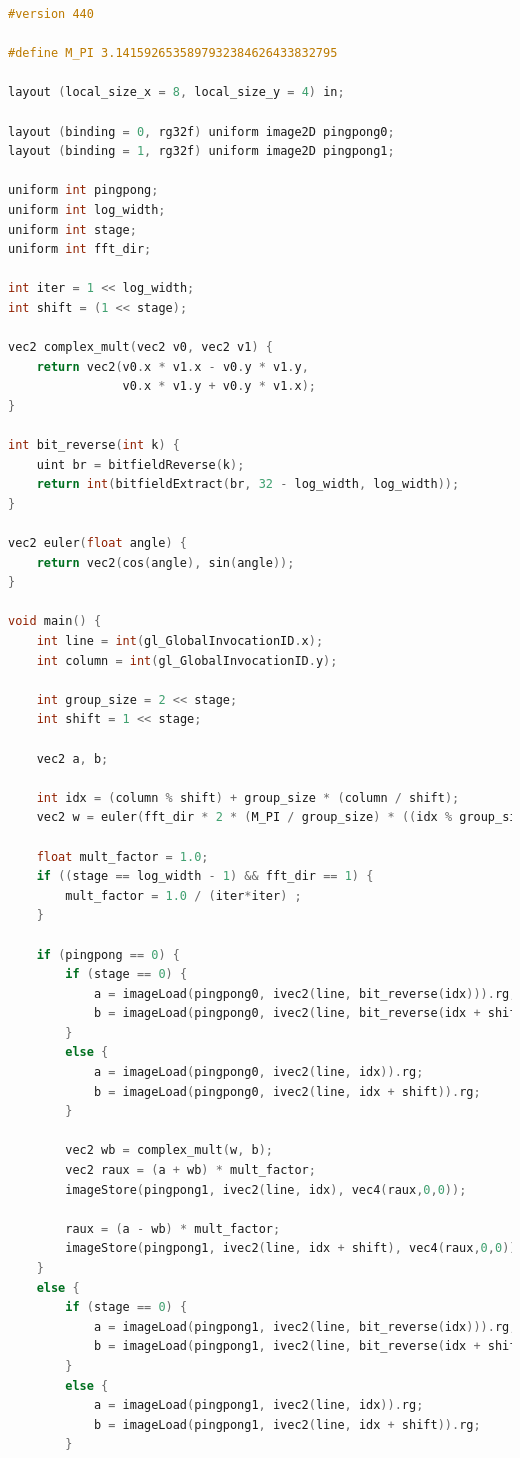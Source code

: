 \documentclass[
  oneside,
  11pt, a4paper,
  footinclude=true,
  headinclude=true,
  cleardoublepage=empty
]{scrbook}
\begin{document}

\begin{lstlisting}[language=C,caption={FFT Radix-2 Cooley-Tukey Vertical stage pass, see \autoref{sec:ct-impl}},label={lst:glsl-radix2-ct-stage-vertical}]
#version 440

#define M_PI 3.1415926535897932384626433832795

layout (local_size_x = 8, local_size_y = 4) in;

layout (binding = 0, rg32f) uniform image2D pingpong0;
layout (binding = 1, rg32f) uniform image2D pingpong1;

uniform int pingpong;
uniform int log_width;
uniform int stage;
uniform int fft_dir;

int iter = 1 << log_width;
int shift = (1 << stage);

vec2 complex_mult(vec2 v0, vec2 v1) {
	return vec2(v0.x * v1.x - v0.y * v1.y,
				v0.x * v1.y + v0.y * v1.x);
}

int bit_reverse(int k) {
    uint br = bitfieldReverse(k);
    return int(bitfieldExtract(br, 32 - log_width, log_width));
}

vec2 euler(float angle) {
	return vec2(cos(angle), sin(angle));
}

void main() {
	int line = int(gl_GlobalInvocationID.x);
	int column = int(gl_GlobalInvocationID.y);

	int group_size = 2 << stage;
	int shift = 1 << stage;

	vec2 a, b;

    int idx = (column % shift) + group_size * (column / shift);
    vec2 w = euler(fft_dir * 2 * (M_PI / group_size) * ((idx % group_size) % shift));

    float mult_factor = 1.0;
    if ((stage == log_width - 1) && fft_dir == 1) {
        mult_factor = 1.0 / (iter*iter) ;
    }

    if (pingpong == 0) {
        if (stage == 0) {
            a = imageLoad(pingpong0, ivec2(line, bit_reverse(idx))).rg;
            b = imageLoad(pingpong0, ivec2(line, bit_reverse(idx + shift))).rg;
        }
        else {
            a = imageLoad(pingpong0, ivec2(line, idx)).rg;
            b = imageLoad(pingpong0, ivec2(line, idx + shift)).rg;
        }

        vec2 wb = complex_mult(w, b);
        vec2 raux = (a + wb) * mult_factor;
        imageStore(pingpong1, ivec2(line, idx), vec4(raux,0,0));
            
        raux = (a - wb) * mult_factor;
        imageStore(pingpong1, ivec2(line, idx + shift), vec4(raux,0,0));
    }
    else {
        if (stage == 0) {
            a = imageLoad(pingpong1, ivec2(line, bit_reverse(idx))).rg;
            b = imageLoad(pingpong1, ivec2(line, bit_reverse(idx + shift))).rg;
        }
        else {	
            a = imageLoad(pingpong1, ivec2(line, idx)).rg;
            b = imageLoad(pingpong1, ivec2(line, idx + shift)).rg;
        }


\end{lstlisting}
\end{document}
